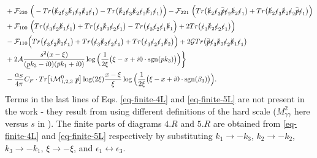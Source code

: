 \documentclass[aps,prd,superscriptaddress,floatfix,showpacs]{revtex4}
\begin{document}
\begin{equation}
\begin{aligned}
&+  \mathcal{F}_{220}~ \Big( -Tr\big( \slashed{k}_2 \slashed{\epsilon}_3 \slashed{k}_1 \slashed{\epsilon}_2 \slashed{k}_2 \slashed{\epsilon}_1  \big) - Tr\big( \slashed{k}_2 \slashed{\epsilon}_3 \slashed{k}_2 \slashed{\epsilon}_2 \slashed{k}_1 \slashed{\epsilon}_1  \big) \Big) 
-  \mathcal{F}_{221}~ \Big( Tr\big( \slashed{k}_2 \slashed{\epsilon}_3 \bar{\slashed{p}} \slashed{\epsilon}_2 \slashed{k}_2 \slashed{\epsilon}_1  \big) + Tr\big( \slashed{k}_2 \slashed{\epsilon}_3 \slashed{k}_2 \slashed{\epsilon}_2 \bar{\slashed{p}} \slashed{\epsilon}_1  \big) \Big) \\
&+\mathcal{F}_{100}~\Big( Tr\big( \slashed{\epsilon}_3 \slashed{\epsilon}_2 \slashed{k}_1 \slashed{\epsilon}_1 \big) + Tr\big( \slashed{\epsilon}_3 \slashed{k}_1 \slashed{\epsilon}_2  \slashed{\epsilon}_1 \big) - Tr\big( \slashed{\epsilon}_3 \slashed{\epsilon}_2  \slashed{\epsilon}_1 \slashed{k}_1 \Big) + 2 Tr\big( \slashed{\epsilon}_3 \slashed{k}_2 \slashed{\epsilon}_2  \slashed{\epsilon}_1 \big) \Big) \\
&-\mathcal{F}_{110}\Big(  Tr\big( \slashed{\epsilon}_3  \slashed{\epsilon}_2 \slashed{k}_2 \slashed{\epsilon}_1 \big) + Tr\big( \slashed{\epsilon}_3 \slashed{k}_2 \slashed{\epsilon}_2  \slashed{\epsilon}_1 \big) + Tr\big( \slashed{\epsilon}_3  \slashed{\epsilon}_2  \slashed{\epsilon}_1 \slashed{k}_2\big) \Big) 
+2 \mathcal{G} Tr\big( \bar{\slashed{p}} \slashed{\epsilon}_3 \slashed{k}_3 \slashed{\epsilon}_2 \slashed{k}_1 \slashed{\epsilon}_1 \big)  \\
&+2 \mathcal{A} \frac{s^2 (x-\xi)}{(\underline{p}k_3-i0)(\bar{p}k_1+i0)} \log \Big{(} \frac{1}{2\xi}\big{(}\xi - x + i0\cdot \mathrm{sgn}(pk_3)\big{)} \Big{)}\bigg\}\\
&- \frac{\alpha_S}{4\pi}C_F \cdot Tr\big[ i\mathcal{M}^0_{1,2,3}~\slashed{p}\big] \log(2\xi) \frac{x-\xi}{\xi}\log \Big{(} \frac{1}{2\xi}\big{(}\xi - x + i0\cdot \mathrm{sgn}(\beta_3)\big{)} \Big{)}.
\end{aligned}
\end{equation}
Terms in the last lines of Eqs. \eqref{eq-finite-4L} and \eqref{eq-finite-5L} are not present in the work \cite{Grocholski:2021gta} - they result from using different definitions of the hard scale ($M_{\gamma\gamma}^2$ here versus $s$ in \cite{Grocholski:2021gta}). The finite parts of diagrams $4.R$  and $5.R$ are obtained from \eqref{eq-finite-4L} and \eqref{eq-finite-5L} respectively by substituting $k_1 \rightarrow -k_3$, $k_2 \rightarrow -k_2$, $k_3 \rightarrow -k_1$, $\xi \rightarrow -\xi$, and $\epsilon_1 \leftrightarrow \epsilon_3$.
\end{document}
